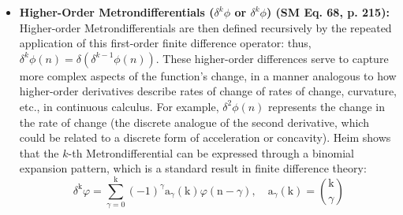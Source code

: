 \documentclass[12pt]{article}
\newcommand{\metrondifferential}{\delta}
\newcommand{\metronenziffer}{n}
\begin{document}
\begin{itemize}
    \item \textbf{Higher-Order Metrondifferentials (\( \metrondifferential^k\phi \) or \( \delta^k\phi \)) (SM Eq. 68, p. 215):}
    Higher-order Metrondifferentials are then defined recursively by the repeated application of this first-order finite difference operator: thus, \( \metrondifferential^k\phi(\metronenziffer) = \metrondifferential(\metrondifferential^{k-1}\phi(\metronenziffer)) \). These higher-order differences serve to capture more complex aspects of the function's change, in a manner analogous to how higher-order derivatives describe rates of change of rates of change, curvature, etc., in continuous calculus. For example, \( \metrondifferential^2\phi(\metronenziffer) \) represents the change in the rate of change (the discrete analogue of the second derivative, which could be related to a discrete form of acceleration or concavity). Heim shows that the \( k \)-th Metrondifferential can be expressed through a binomial expansion pattern, which is a standard result in finite difference theory:
    \begin{equation}
    \delta^\mathrm{k}\varphi = \sum_{\gamma=0}^\mathrm{k} (-1)^\gamma \mathrm{a}_\gamma(\mathrm{k})\varphi(\mathrm{n}-\gamma), \quad \mathrm{a}_\gamma(\mathrm{k}) = \binom{\mathrm{k}}{\gamma} \tag{68}
    \label{eq:original_kth_metrondifferential}
    \end{equation}


\end{itemize}
\end{document}
